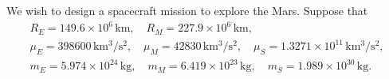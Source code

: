 \documentclass[10pt]{article}
\theoremstyle{plain}\theorembodyfont{\normalfont}
\newtheorem{prob}{Problem}[section]
\newenvironment{subprob}%
{\renewcommand{\theenumi}{\alph{enumi}}\renewcommand{\labelenumi}{(\theenumi)}\begin{enumerate}}%
{\end{enumerate}}%
\begin{document}
%
%

\clearpage\newpage

\noindent We wish to design a spacecraft mission to explore the Mars. Suppose that
\begin{gather*}
R_{E}=149.6\times 10^6\,\mathrm{km},\quad
R_{M}=227.9\times 10^6\,\mathrm{km},\\
\mu_E=398600\,\mathrm{km^3/s^2},\quad
\mu_M=42830\,\mathrm{km^3/s^2},\quad
\mu_S=1.3271\times 10^{11}\,\mathrm{km^3/s^2},\\
m_E=5.974\times 10^{24}\,\mathrm{kg},\quad
m_M=6.419\times 10^{23}\,\mathrm{kg},\quad
m_S=1.989\times 10^{30}\,\mathrm{kg}.
\end{gather*}
\end{document}

